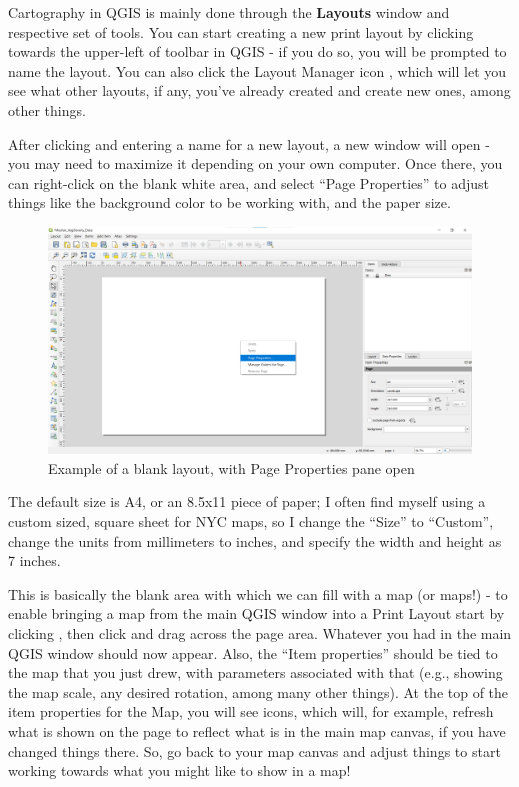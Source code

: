 \documentclass[
  letterpaper,
  DIV=11,
  numbers=noendperiod]{scrreprt}
\begin{document}
Cartography in QGIS is mainly done through the \textbf{Layouts} window
and respective set of tools. You can start creating a new print layout
by clicking 
towards the upper-left of toolbar in QGIS - if you do so, you will be
prompted to name the layout. You can also click the Layout Manager icon
, which will
let you see what other layouts, if any, you've already created and
create new ones, among other things.

After clicking 
and entering a name for a new layout, a new window will open - you may
need to maximize it depending on your own computer. Once there, you can
right-click on the blank white area, and select ``Page Properties'' to
adjust things like the background color to be working with, and the
paper size.

\begin{figure}

{\centering \includegraphics{./images/LayoutWindow.png}

}

\caption{Example of a blank layout, with Page Properties pane open}

\end{figure}

The default size is A4, or an 8.5x11 piece of paper; I often find myself
using a custom sized, square sheet for NYC maps, so I change the
``Size'' to ``Custom'', change the units from millimeters to inches, and
specify the width and height as 7 inches.

This is basically the blank area with which we can fill with a map (or
maps!) - to enable bringing a map from the main QGIS window into a Print
Layout start by clicking
, then click and drag
across the page area. Whatever you had in the main QGIS window should
now appear. Also, the ``Item properties'' should be tied to the map that
you just drew, with parameters associated with that (e.g., showing the
map scale, any desired rotation, among many other things). At the top of
the item properties for the Map, you will see icons, which will, for
example, refresh what is shown on the page to reflect what is in the
main map canvas, if you have changed things there. So, go back to your
map canvas and adjust things to start working towards what you might
like to show in a map!
\end{document}
